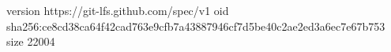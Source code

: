 version https://git-lfs.github.com/spec/v1
oid sha256:ce8cd38ca64f42cad763e9cfb7a43887946cf7d5be40c2ae2ed3a6ec7e67b753
size 22004
